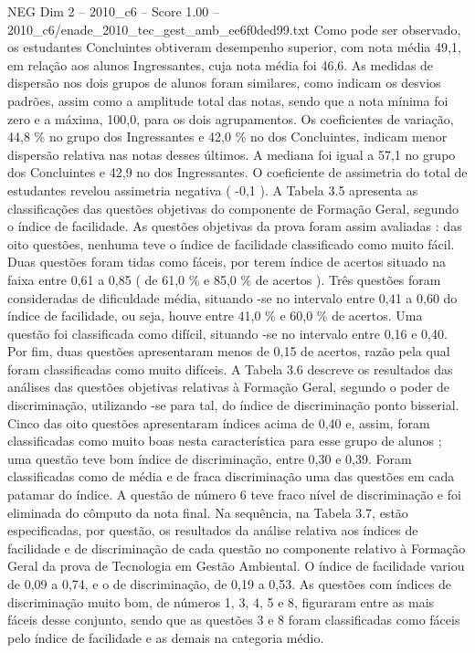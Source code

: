 \begin{textsample}{NEG Dim 2 – 2010\_c6 – Score 1.00 – 2010\_c6/enade\_2010\_tec\_gest\_amb\_ee6f0ded99.txt}
Como pode ser observado, os estudantes Concluintes obtiveram desempenho superior, com nota média 49,1, em relação aos alunos Ingressantes, cuja nota média foi 46,6.
As medidas de dispersão nos dois grupos de alunos foram similares, como indicam os desvios padrões, assim como a amplitude total das notas, sendo que a nota mínima foi zero e a máxima, 100,0, para os dois agrupamentos.
Os coeficientes de variação, 44,8 \% no grupo dos Ingressantes e 42,0 \% no dos Concluintes, indicam menor dispersão relativa nas notas desses últimos.
A mediana foi igual a 57,1 no grupo dos Concluintes e 42,9 no dos Ingressantes.
O coeficiente de assimetria do total de estudantes revelou assimetria negativa ( -0,1 ).
A Tabela 3.5 apresenta as classificações das questões objetivas do componente de Formação Geral, segundo o índice de facilidade.
As questões objetivas da prova foram assim avaliadas : das oito questões, nenhuma teve o índice de facilidade classificado como muito fácil.
Duas questões foram tidas como fáceis, por terem índice de acertos situado na faixa entre 0,61 a 0,85 ( de 61,0 \% e 85,0 \% de acertos ).
Três questões foram consideradas de dificuldade média, situando -se no intervalo entre 0,41 a 0,60 do índice de facilidade, ou seja, houve entre 41,0 \% e 60,0 \% de acertos.
Uma questão foi classificada como difícil, situando -se no intervalo entre 0,16 e 0,40.
Por fim, duas questões apresentaram menos de 0,15 de acertos, razão pela qual foram classificadas como muito difíceis.
A Tabela 3.6 descreve os resultados das análises das questões objetivas relativas à Formação Geral, segundo o poder de discriminação, utilizando -se para tal, do índice de discriminação ponto bisserial.
Cinco das oito questões apresentaram índices acima de 0,40 e, assim, foram classificadas como muito boas nesta característica para esse grupo de alunos ; uma questão teve bom índice de discriminação, entre 0,30 e 0,39.
Foram classificadas como de média e de fraca discriminação uma das questões em cada patamar do índice.
A questão de número 6 teve fraco nível de discriminação e foi eliminada do cômputo da nota final.
Na sequência, na Tabela 3.7, estão especificadas, por questão, os resultados da análise relativa aos índices de facilidade e de discriminação de cada questão no componente relativo à Formação Geral da prova de Tecnologia em Gestão Ambiental.
O índice de facilidade variou de 0,09 a 0,74, e o de discriminação, de 0,19 a 0,53.
As questões com índices de discriminação muito bom, de números 1, 3, 4, 5 e 8, figuraram entre as mais fáceis desse conjunto, sendo que as questões 3 e 8 foram classificadas como fáceis pelo índice de facilidade e as demais na categoria médio.

\end{textsample}

